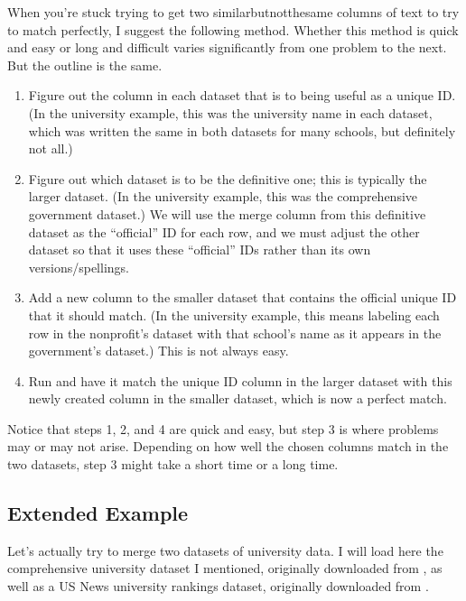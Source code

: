 \documentclass[letterpaper,10pt,english]{sphinxmanual}
\begin{document}
When you’re stuck trying to get two similar\sphinxhyphen{}but\sphinxhyphen{}not\sphinxhyphen{}the\sphinxhyphen{}same columns of text to try to match perfectly, I suggest the following method.  Whether this method is quick and easy or long and difficult varies significantly from one problem to the next.  But the outline is the same.
\begin{enumerate}
%
\item {} 
Figure out the column in each dataset that is  to being useful as a unique ID.  (In the university example, this was the university name in each dataset, which was written the same in both datasets for many schools, but definitely not all.)

\item {} 
Figure out which dataset is to be the definitive one; this is typically the larger dataset.  (In the university example, this was the comprehensive government dataset.)  We will use the merge column from this definitive dataset as the “official” ID for each row, and we must adjust the other dataset so that it uses these “official” IDs rather than its own versions/spellings.

\item {} 
Add a new column to the smaller dataset that contains the official unique ID  that it should match.  (In the university example, this means labeling each row in the nonprofit’s dataset with that school’s name as it appears in the government’s dataset.)  This is not always easy.

\item {} 
Run  and have it match the unique ID column in the larger dataset with this newly created column in the smaller dataset, which is now a perfect match.

\end{enumerate}

Notice that steps 1, 2, and 4 are quick and easy, but step 3 is where problems may or may not arise.  Depending on how well the chosen columns match in the two datasets, step 3 might take a short time or a long time.


\subsection{Extended Example}
\label{\detokenize{chapter-12-concat-and-merge:extended-example}}
Let’s actually try to merge two datasets of university data.  I will load here the comprehensive university dataset I mentioned, originally downloaded from , as well as a US News university rankings dataset, originally downloaded from .
\end{document}
